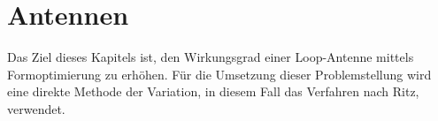 %
%
%
%
\chapter{Antennen\label{chapter:antennen}}
\begin{refsection}

Das Ziel dieses Kapitels ist, den Wirkungsgrad einer Loop-Antenne mittels 
Formoptimierung zu erhöhen. Für die Umsetzung dieser Problemstellung wird 
eine direkte Methode der Variation, in diesem Fall das Verfahren nach Ritz, 
verwendet.








\printbibliography[heading=subbibliography]
\end{refsection}
